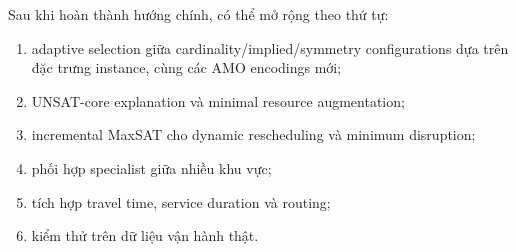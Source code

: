 \documentclass[12pt,a4paper]{article}
\begin{document}
Sau khi hoàn thành hướng chính, có thể mở rộng theo thứ tự:
\begin{enumerate}
  \item adaptive selection giữa cardinality/implied/symmetry configurations
        dựa trên đặc trưng instance, cùng các AMO encodings mới;
  \item UNSAT-core explanation và minimal resource augmentation;
  \item incremental MaxSAT cho dynamic rescheduling và minimum disruption;
  \item phối hợp specialist giữa nhiều khu vực;
  \item tích hợp travel time, service duration và routing;
  \item kiểm thử trên dữ liệu vận hành thật.
\end{enumerate}
\end{document}
